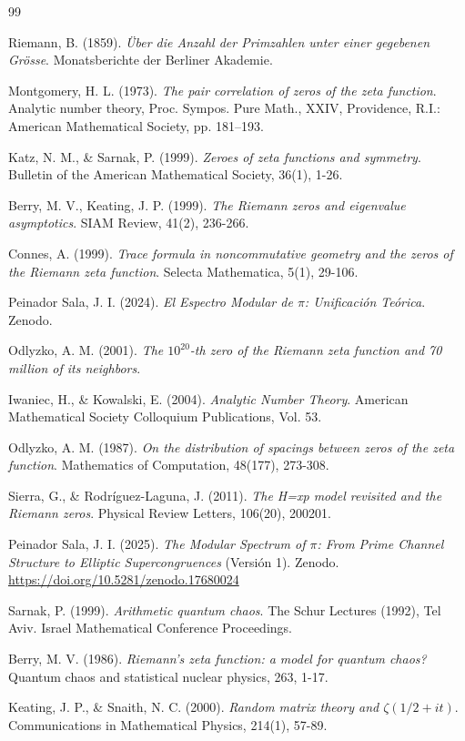 \documentclass[12pt, a4paper]{article}
\theoremstyle{plain}
\theoremstyle{definition}
\begin{document}
\begin{thebibliography}{99}

Riemann, B. (1859). \textit{Über die Anzahl der Primzahlen unter einer gegebenen Grösse}. Monatsberichte der Berliner Akademie.

Montgomery, H. L. (1973). \textit{The pair correlation of zeros of the zeta function}. Analytic number theory, Proc. Sympos. Pure Math., XXIV, Providence, R.I.: American Mathematical Society, pp. 181--193.

Katz, N. M., \& Sarnak, P. (1999). \textit{Zeroes of zeta functions and symmetry}. Bulletin of the American Mathematical Society, 36(1), 1-26.

Berry, M. V., Keating, J. P. (1999). \textit{The Riemann zeros and eigenvalue asymptotics}. SIAM Review, 41(2), 236-266.

Connes, A. (1999). \textit{Trace formula in noncommutative geometry and the zeros of the Riemann zeta function}. Selecta Mathematica, 5(1), 29-106.

Peinador Sala, J. I. (2024). \textit{El Espectro Modular de $\pi$: Unificación Teórica}. Zenodo.

Odlyzko, A. M. (2001). \textit{The $10^{20}$-th zero of the Riemann zeta function and 70 million of its neighbors}.

Iwaniec, H., \& Kowalski, E. (2004). \textit{Analytic Number Theory}. American Mathematical Society Colloquium Publications, Vol. 53.


Odlyzko, A. M. (1987). \textit{On the distribution of spacings between zeros of the zeta function}. Mathematics of Computation, 48(177), 273-308.

Sierra, G., \& Rodríguez-Laguna, J. (2011). \textit{The H=xp model revisited and the Riemann zeros}. Physical Review Letters, 106(20), 200201.

Peinador Sala, J. I. (2025). \textit{The Modular Spectrum of $\pi$: From Prime Channel Structure to Elliptic Supercongruences} (Versión 1). Zenodo. \url{https://doi.org/10.5281/zenodo.17680024}

Sarnak, P. (1999). \textit{Arithmetic quantum chaos}. The Schur Lectures (1992), Tel Aviv. Israel Mathematical Conference Proceedings.

Berry, M. V. (1986). \textit{Riemann's zeta function: a model for quantum chaos?} Quantum chaos and statistical nuclear physics, 263, 1-17.

Keating, J. P., \& Snaith, N. C. (2000). \textit{Random matrix theory and $\zeta(1/2+it)$}. Communications in Mathematical Physics, 214(1), 57-89.

\end{thebibliography}
\end{document}
